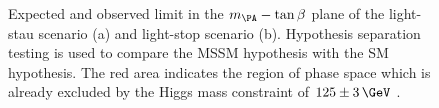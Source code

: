 \begin{figure}[tbh]
\caption[Expected and observed limit in the $m_{\PA}-\tan\beta$ plane of the
light-stau scenario (a) and light-stop scenario (b).]
{Expected and observed limit in the $m_{\PA}-\tan\beta$ plane of the
light-stau scenario (a) and light-stop scenario (b). Hypothesis
separation testing is used to compare the \ac{MSSM} hypothesis with the \ac{SM}
hypothesis. The red area indicates the region of phase space which is already
excluded by the Higgs mass constraint of $125\pm3\,\GeV$ \cite{HIG-13-021}.}
\label{fig:lightstaulightstop}
\end{figure}

